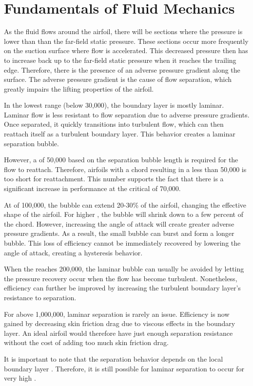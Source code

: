 \documentclass[letterpaper,12pt,]{article}
\begin{document}
\section{Fundamentals of Fluid Mechanics}

As the fluid flows around the airfoil, there will be sections where the pressure is lower than than the far-field static pressure. These sections occur more frequently on the suction surface where flow is accelerated. This decreased pressure then has to increase back up to the far-field static pressure when it reaches the trailing edge. Therefore, there is the presence of an adverse pressure gradient along the surface. The adverse pressure gradient is the cause of flow separation, which greatly impairs the lifting properties of the airfoil.

In the lowest \rn range (below 30,000), the boundary layer is mostly laminar. Laminar flow is less resistant to flow separation due to adverse pressure gradients. Once separated, it quickly transitions into turbulent flow, which can then reattach itself as a turbulent boundary layer. This behavior creates a laminar separation bubble.

However, a \rn of 50,000 based on the separation bubble length is required for the flow to reattach. Therefore, airfoils with a chord resulting in a \rn less than 50,000 is too short for reattachment. This number supports the fact that there is a significant increase in performance at the critical \rn of 70,000.

At \rn of 100,000, the bubble can extend 20-30\% of the airfoil, changing the effective shape of the airfoil. For higher \rn, the bubble will shrink down to a few percent of the chord. However, increasing the angle of attack will create greater adverse pressure gradients. As a result, the small bubble can burst and form a longer bubble. This loss of efficiency cannot be immediately recovered by lowering the angle of attack, creating a hysteresis behavior.

When the \rn reaches 200,000, the laminar bubble can usually be avoided by letting the pressure recovery occur when the flow has become turbulent. Nonetheless, efficiency can further be improved by increasing the turbulent boundary layer's resistance to separation.

For \rn above 1,000,000, laminar separation is rarely an issue. Efficiency is now gained by decreasing skin friction drag due to viscous effects in the boundary layer. An ideal airfoil would therefore have just enough separation resistance without the cost of adding too much skin friction drag.

It is important to note that the separation behavior depends on the local boundary layer \rn. Therefore, it is still possible for laminar separation to occur for very high \rn.


%
%
\end{document}

